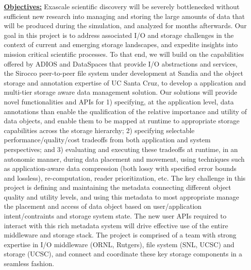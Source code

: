 \documentclass[11pt,letterpaper]{article}
\begin{document}
\underline{\textbf{Objectives:}}
Exascale scientific discovery will be severely bottlenecked without sufficient
new research into managing and storing the large amounts of data that will be
produced during the simulation, and analyzed for months afterwards.  Our goal
in this project is to address associated I/O and storage challenges in the context 
of current and emerging storage landscapes, and expedite insights into mission 
critical scientific processes. To that end, we will build on the capabilities offered
by ADIOS and DataSpaces that provide I/O abstractions and services, the Sirocco 
peer-to-peer file system under development at Sandia and the object storage 
and annotation expertise of UC Santa Cruz, to develop a application and 
multi-tier storage aware data management solution. Our solutions will provide
novel functionalities and APIs for 
1) specifying, at the application level, data annotations than enable the qualification
 of the relative importance and utility of data objects, and enable them to be 
 mapped at runtime to appropriate storage capabilities across the storage hierarchy;
2) specifying selectable performance/quality/cost tradeoffs from both application and system perspectives; and
3) evaluating and executing these tradeoffs at runtime, in an autonomic manner,
during data placement and movement, using techniques such as application-aware 
data compression (both lossy with specified error bounds and lossless), re-computation, 
reader prioritization, etc.
The key challenge in this project is defining and maintaining the metadata
 connecting different object quality and utility levels, and using this metadata 
 to most appropriate manage the placement and access of data object based on 
 user/application intent/contraints and storage system state.
The new user APIs required to interact with this rich metadata system will drive effective
use of the entire middleware and storage stack. 
The project is comprised of a team with strong expertise in I/O middleware (ORNL, Rutgers), file system (SNL,
UCSC) and storage (UCSC), and connect and coordinate these key storage
components in a seamless fashion.
\end{document}
